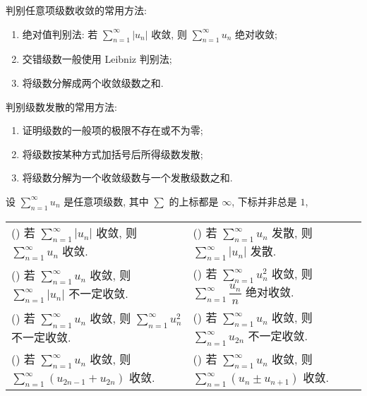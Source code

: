 判别任意项级数收敛的常用方法:
\begin{enumerate}[label=(\arabic{*})]
    \item 绝对值判别法: 若 $\displaystyle  \sum_{n=1}^{\infty}\left|u_{n}\right| $ 收敛, 则 $\displaystyle  \sum_{n=1}^{\infty} u_{n} $ 绝对收敛;
    \item 交错级数一般使用 Leibniz 判别法;
    \item 将级数分解成两个收敛级数之和.
\end{enumerate}

判别级数发散的常用方法:
\begin{enumerate}[label=(\arabic{*})]
    \item 证明级数的一般项的极限不存在或不为零;
    \item 将级数按某种方式加括号后所得级数发散;
    \item 将级数分解为一个收敛级数与一个发散级数之和.
\end{enumerate}

\begin{theorem}
    设 $\displaystyle\sum_{n=1}^{\infty}u_n$ 是任意项级数, 其中 $\sum$ 的上标都是 $\infty$, 下标并非总是 $1$,
    \setcounter{magicrownumbers}{0}
    \begin{table}[H]
        \centering
        \begin{tabular}{l l}
            (\rownumber{}) 若 $\displaystyle \sum_{n=1}^{\infty}|u_n|$ 收敛, 则 $\displaystyle\sum_{n=1}^{\infty}u_n$ 收敛.            & (\rownumber{}) 若 $\displaystyle\sum_{n=1}^{\infty}u_n$ 发散, 则 $\displaystyle\sum_{n=1}^{\infty}|u_n|$ 发散.                \\
            (\rownumber{}) 若 $\displaystyle\sum_{n=1}^{\infty}u_n$ 收敛, 则 $\displaystyle\sum_{n=1}^{\infty}|u_n|$ 不一定收敛.       & (\rownumber{}) 若 $\displaystyle\sum_{n=1}^{\infty}u^2_n$ 收敛, 则 $\displaystyle\sum_{n=1}^{\infty}\dfrac{u_n}{n}$ 绝对收敛. \\
            (\rownumber{}) 若 $\displaystyle\sum_{n=1}^{\infty}u_n$ 收敛, 则 $\displaystyle\sum_{n=1}^{\infty}u^2_n$ 不一定收敛.       & (\rownumber{}) 若 $\displaystyle\sum_{n=1}^{\infty}u_n$ 收敛, 则 $\displaystyle\sum_{n=1}^{\infty}u_{2n}$ 不一定收敛.         \\
            (\rownumber{}) 若 $\displaystyle\sum_{n=1}^{\infty}u_n$ 收敛, 则 $\displaystyle\sum_{n=1}^{\infty}(u_{2n-1}+u_{2n})$ 收敛. & (\rownumber{}) 若 $\displaystyle\sum_{n=1}^{\infty}u_n$ 收敛, 则 $\displaystyle\sum_{n=1}^{\infty}(u_{n}\pm u_{n+1})$ 收敛.
        \end{tabular}
    \end{table}
\end{theorem}

